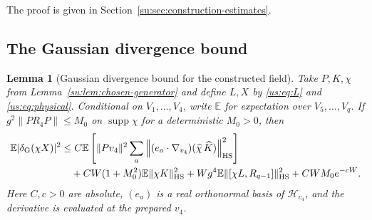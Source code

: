\documentclass[11pt]{article}
\numberwithin{equation}{section}
\newtheorem{lemma}[theorem]{Lemma}
\theoremstyle{remark}
\newcommand{\E}{\mathbb E}
\newcommand{\supp}{\operatorname{supp}}
\newcommand{\HS}{\mathrm{HS}}
\begin{document}
The proof is given in Section~\ref{su:sec:construction-estimates}.

\subsection{The Gaussian divergence bound}
\label{su:sec:generator-bounds}

\begin{lemma}[Gaussian divergence bound for the constructed field]
\label{us:lem:score}
Take $P,K,\chi$ from Lemma~\ref{su:lem:chosen-generator} and define
$L,X$ by \eqref{us:eq:L} and \eqref{us:eq:physical}. Conditional on
$V_1,\ldots,V_4$, write $\E$ for expectation over $V_5,\ldots,V_q$.
If $g^2\|PR_4P\|\le M_0$ on $\supp\chi$ for a deterministic $M_0>0$, then
\begin{equation}\label{us:eq:score}
 \begin{aligned}
  \E|\delta_{\rm G}(\chi X)|^2
 &\le C\E\left[\|Pv_4\|^2\sum_a
       \left\|(e_a\cdot\nabla_{v_4})(\widehat\chi\,\widehat K)\right\|_{\HS}^2\right]\\
 &\quad+CW(1+M_0^2)\E\|\chi K\|_{\HS}^2
       +Wg^4\E\|[\chi L,R_{q-1}]\|_{\HS}^2
       +CWM_0e^{-cW}.
 \end{aligned}
\end{equation}
Here $C,c>0$ are absolute, $(e_a)$ is a real orthonormal basis of
$\mathcal H_{v_4}$, and the derivative is evaluated at the prepared $v_4$.
\end{lemma}
\end{document}
